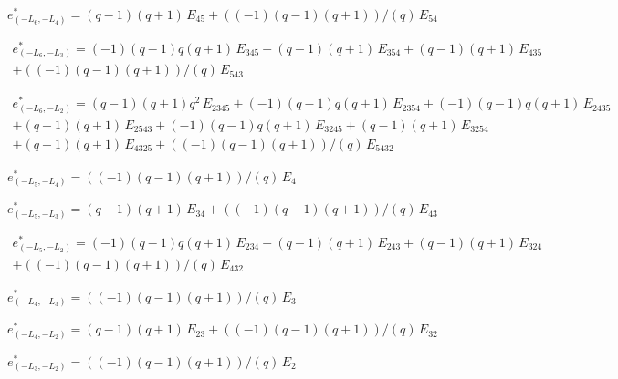 $e^*_{(-L_6, -L_4)} = (q-1)(q+1)\,E_{45} + ((-1)(q-1)(q+1))/(q)\,E_{54}$

\begin{multline*}
e^*_{(-L_6, -L_3)} = 
  (-1)(q-1)q(q+1)\,E_{345} + (q-1)(q+1)\,E_{354} + (q-1)(q+1)\,E_{435}
  \\
  + ((-1)(q-1)(q+1))/(q)\,E_{543}
\end{multline*}

\begin{multline*}
e^*_{(-L_6, -L_2)} = 
  (q-1)(q+1)q^2\,E_{2345} + (-1)(q-1)q(q+1)\,E_{2354} + (-1)(q-1)q(q+1)\,E_{2435}
  \\
  + (q-1)(q+1)\,E_{2543} + (-1)(q-1)q(q+1)\,E_{3245} + (q-1)(q+1)\,E_{3254}
  \\
  + (q-1)(q+1)\,E_{4325} + ((-1)(q-1)(q+1))/(q)\,E_{5432}
\end{multline*}

$e^*_{(-L_5, -L_4)} = ((-1)(q-1)(q+1))/(q)\,E_{4}$

$e^*_{(-L_5, -L_3)} = (q-1)(q+1)\,E_{34} + ((-1)(q-1)(q+1))/(q)\,E_{43}$

\begin{multline*}
e^*_{(-L_5, -L_2)} = 
  (-1)(q-1)q(q+1)\,E_{234} + (q-1)(q+1)\,E_{243} + (q-1)(q+1)\,E_{324}
  \\
  + ((-1)(q-1)(q+1))/(q)\,E_{432}
\end{multline*}

$e^*_{(-L_4, -L_3)} = ((-1)(q-1)(q+1))/(q)\,E_{3}$

$e^*_{(-L_4, -L_2)} = (q-1)(q+1)\,E_{23} + ((-1)(q-1)(q+1))/(q)\,E_{32}$

$e^*_{(-L_3, -L_2)} = ((-1)(q-1)(q+1))/(q)\,E_{2}$

